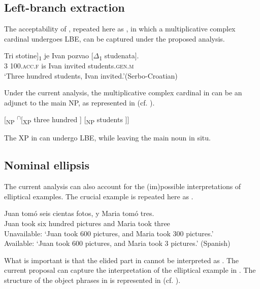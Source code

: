 \documentclass[output=paper]{langscibook}
\begin{document}
\subsection{Left-branch extraction}\label{tat:sec:lbe.prop}
The acceptability of , repeated here as , in which a multiplicative complex cardinal undergoes LBE, can be captured under the proposed analysis. 

\ea\label{tat:ex:LBE.1.rep}
\gll \minsp{[} {Tri} {stotine}]\textsubscript{$1$} je Ivan pozvao [$\Delta$\textsubscript{$1$} studenata].\\  
    {} 3 100.\textsc{acc.f} is Ivan invited {} students.\textsc{gen.m}\\ 
\glt `Three hundred students, Ivan invited.'\hfill(Serbo-Croatian)
\z	

\noindent Under the current analysis, the multiplicative complex cardinal in  can be an adjunct to the main NP, as represented in  (cf. ).

\ea\label{tat:ex:st.LBE.SC}
{[}\textsubscript{NP} \textsuperscript{$\cap$}[\textsubscript{XP} three hundred ] [\textsubscript{NP} students ]]
\z

\noindent The XP in  can undergo LBE, while leaving the main noun in situ. 

\subsection{Nominal ellipsis}\label{tat:sec:ne.prop}

The current analysis can also account for the (im)possible interpretations of elliptical examples. The crucial example is repeated here as .

\ea\label{tat:elli.rep}
\gll Juan tomó seis cientas fotos, y Maria tomó tres.\\  
    Juan took six hundred pictures and Maria took three\\ 
\glt Unavailable: `Juan took 600 pictures, and Maria took 300 pictures.'\\
Available: `Juan took 600 pictures, and Maria took 3 pictures.' \hfill(Spanish)
\z

\noindent What is important is that the elided part in  cannot be interpreted as . The current proposal can capture the interpretation of the elliptical example in . The structure of the object phrases in  is represented in  (cf. ). 
\end{document}
